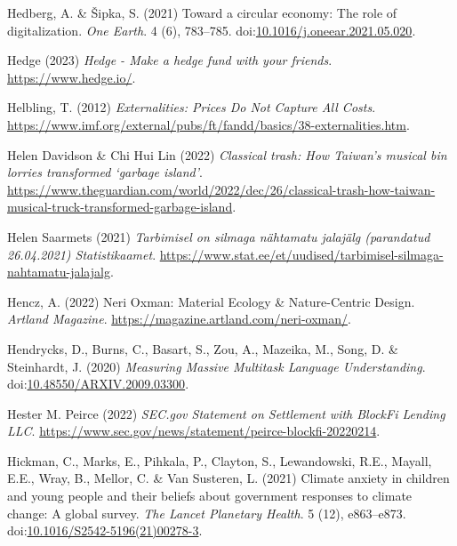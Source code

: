 \documentclass[
  letterpaper,
  DIV=11,
  numbers=noendperiod]{scrartcl}
\newlength{\cslhangindent}
\newenvironment{CSLReferences}[2] %
 {\begin{list}{}{%
  \setlength{\itemindent}{0pt}
  \setlength{\leftmargin}{0pt}
  \setlength{\parsep}{0pt}
  \ifodd #1
   \setlength{\leftmargin}{\cslhangindent}
   \setlength{\itemindent}{-1\cslhangindent}
  \fi
  \setlength{\itemsep}{#2\baselineskip}}}
 {\end{list}}
\begin{document}
\begin{CSLReferences}{0}{1}
Hedberg, A. \& Šipka, S. (2021) Toward a circular economy: {The} role of
digitalization. \emph{One Earth}. 4 (6), 783--785.
doi:\href{https://doi.org/10.1016/j.oneear.2021.05.020}{10.1016/j.oneear.2021.05.020}.

Hedge (2023) \emph{Hedge - {Make} a hedge fund with your friends}.
\url{https://www.hedge.io/}.

Helbling, T. (2012) \emph{Externalities: {Prices Do Not Capture All
Costs}}.
\url{https://www.imf.org/external/pubs/ft/fandd/basics/38-externalities.htm}.

Helen Davidson \& Chi Hui Lin (2022) \emph{Classical trash: How
{Taiwan}'s musical bin lorries transformed {`garbage island'}}.
\url{https://www.theguardian.com/world/2022/dec/26/classical-trash-how-taiwan-musical-truck-transformed-garbage-island}.

Helen Saarmets (2021) \emph{{Tarbimisel on silmaga n{ä}htamatu
jalaj{ä}lg (parandatud 26.04.2021) {\textbar} Statistikaamet}}.
\url{https://www.stat.ee/et/uudised/tarbimisel-silmaga-nahtamatu-jalajalg}.

Hencz, A. (2022) Neri {Oxman}: {Material Ecology} \& {Nature-Centric
Design}. \emph{Artland Magazine}.
\url{https://magazine.artland.com/neri-oxman/}.

Hendrycks, D., Burns, C., Basart, S., Zou, A., Mazeika, M., Song, D. \&
Steinhardt, J. (2020) \emph{Measuring {Massive Multitask Language
Understanding}}.
doi:\href{https://doi.org/10.48550/ARXIV.2009.03300}{10.48550/ARXIV.2009.03300}.

Hester M. Peirce (2022) \emph{{SEC}.gov {\textbar} {Statement} on
{Settlement} with {BlockFi Lending LLC}}.
\url{https://www.sec.gov/news/statement/peirce-blockfi-20220214}.

Hickman, C., Marks, E., Pihkala, P., Clayton, S., Lewandowski, R.E.,
Mayall, E.E., Wray, B., Mellor, C. \& Van Susteren, L. (2021) Climate
anxiety in children and young people and their beliefs about government
responses to climate change: A global survey. \emph{The Lancet Planetary
Health}. 5 (12), e863--e873.
doi:\href{https://doi.org/10.1016/S2542-5196(21)00278-3}{10.1016/S2542-5196(21)00278-3}.


\end{CSLReferences}
\end{document}
